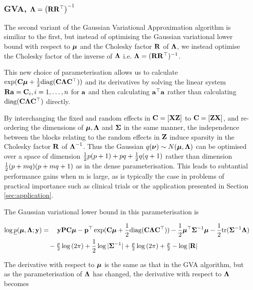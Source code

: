 \documentclass{article}[12pt]
\begin{document}
\subsubsection{GVA, ${\boldsymbol \Lambda} = \left ({\bf R} {\bf R}^\top \right )^{-1}$}

The second variant of the Gaussian Variational Approximation algorithm is similiar to the first, but instead
of optimising the Gaussian variational lower bound with respect to ${\boldsymbol \mu}$ and the Cholesky factor ${\bf R}$ of
${\boldsymbol \Lambda}$, we instead optimise the Cholesky factor of the inverse of ${\boldsymbol \Lambda}$ i.e. ${\boldsymbol \Lambda} = ({\bf R}
{\bf R}^\top)^{-1}$.

This new choice of parameterisation allows us to calculate $\exp({\bf C} {\boldsymbol \mu} + {\frac{1}{2}} \text{diag}({\bf C} {\boldsymbol \Lambda}
{\bf C}^\top))$ and its derivatives by solving the linear system ${\bf R} {\bf a} = {\bf C}_{i}, i=1, \ldots, n$ for ${\bf a}$ and
then calculating ${\bf a}^\top{\bf a}$ rather than calculating $\text{diag}({\bf C} {\boldsymbol \Lambda} {\bf C}^\top)$ directly.

By interchanging the fixed and random effects in ${\bf C} = [{\bf X} {\bf Z}]$ to ${\bf C} = [{\bf Z} {\bf X}]$, and re- ordering the
dimensions of ${\boldsymbol \mu}, {\boldsymbol \Lambda}$ and ${\boldsymbol \Sigma}$ in the same manner, the independence between the blocks relating
to the random effects in ${\bf Z}$ induce sparsity in the Cholesky factor ${\bf R}$ of ${\boldsymbol \Lambda}^{-1}$. Thus the
Gaussian $q({\boldsymbol \nu}) \sim N({\boldsymbol \mu}, {\boldsymbol \Lambda})$ can be optimised over a space of dimension ${\frac{1}{2}} p (p + 1) + pq +
{\frac{1}{2}} q (q + 1)$ rather than dimension ${\frac{1}{2}} (p + mq) (p + mq + 1)$ as in the dense parameterisation. This
leads to subtantial performance gains when m is large, as is typically the case in problems of practical
importance such as clinical trials or the application presented in Section \ref{sec:application}.

The Gaussian variational lower bound in this parameterisation is

\begin{align*}
\log \underline{p}({\boldsymbol \mu}, {\boldsymbol \Lambda}; {\bf y}) &= \quad {\bf y}{\bf P}{\bf C} {\boldsymbol\mu} - {\bf p}^\top \exp({\bf C} {\boldsymbol \mu} + {\frac{1}{2}} \text{diag}({\bf C} {\boldsymbol \Lambda} {\bf C}^\top)) - {\frac{1}{2}} {\boldsymbol \mu}^\top {\boldsymbol\Sigma}^{-1} {\boldsymbol \mu} - {\frac{1}{2}} \text{tr}{({\boldsymbol\Sigma}^{-1} {\boldsymbol\Lambda})} \\
&\quad- \tfrac{p}{2} \log{(2 \pi)} + {\frac{1}{2}} \log{|{\boldsymbol\Sigma}^{-1}|} + \tfrac{p}{2} \log{(2 \pi)} + \tfrac{p}{2} - \log{|{\bf R}|}
\end{align*}

The derivative with respect to ${\boldsymbol \mu}$ is the same as that in the GVA algorithm, but as the parameterisation of
${\boldsymbol \Lambda}$ has changed, the  derivative with respect to ${\boldsymbol \Lambda}$ becomes
\end{document}
